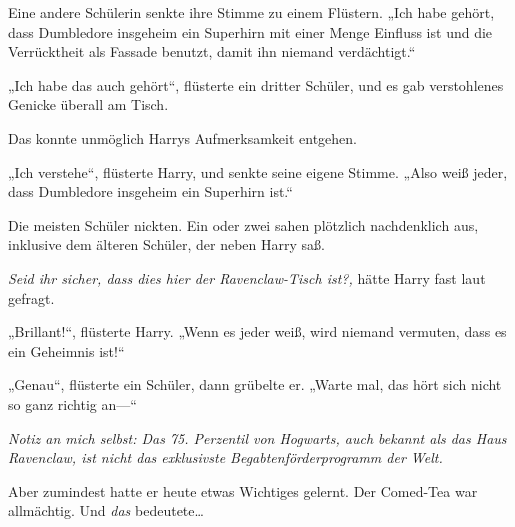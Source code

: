 Eine andere Schülerin senkte ihre Stimme zu einem Flüstern. „Ich habe gehört, dass Dumbledore insgeheim ein Superhirn mit einer Menge Einfluss ist und die Verrücktheit als Fassade benutzt, damit ihn niemand verdächtigt.“

„Ich habe das auch gehört“, flüsterte ein dritter Schüler, und es gab verstohlenes Genicke überall am Tisch.

Das konnte unmöglich Harrys Aufmerksamkeit entgehen.

„Ich verstehe“, flüsterte Harry, und senkte seine eigene Stimme. „Also weiß jeder, dass Dumbledore insgeheim ein Superhirn ist.“

Die meisten Schüler nickten. Ein oder zwei sahen plötzlich nachdenklich aus, inklusive dem älteren Schüler, der neben Harry saß.

\emph{Seid ihr sicher, dass dies hier der Ravenclaw-Tisch ist?,} hätte Harry fast laut gefragt.

„Brillant!“, flüsterte Harry. „Wenn es jeder weiß, wird niemand vermuten, dass es ein Geheimnis ist!“

„Genau“, flüsterte ein Schüler, dann grübelte er. „Warte mal, das hört sich nicht so ganz richtig an—“

\emph{Notiz an mich selbst: Das 75. Perzentil von Hogwarts, auch bekannt als das Haus Ravenclaw, ist nicht das exklusivste Begabtenförderprogramm der Welt.}

Aber zumindest hatte er heute etwas Wichtiges gelernt. Der Comed-Tea war allmächtig. Und \emph{das} bedeutete…

